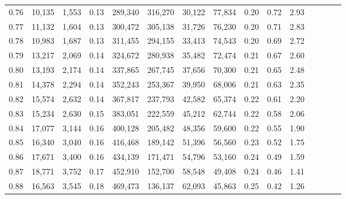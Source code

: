 \begin{tabular}{rrrcrrrrrrrrrrr}
0.76 &  10,135 &  1,553 &                                       0.13 &  289,340 &  316,270 &   30,122 &   77,834 &  0.20 &  0.72 &                         2.93 \\
0.77 &  11,132 &  1,604 &                                       0.13 &  300,472 &  305,138 &   31,726 &   76,230 &  0.20 &  0.71 &                         2.83 \\
0.78 &  10,983 &  1,687 &                                       0.13 &  311,455 &  294,155 &   33,413 &   74,543 &  0.20 &  0.69 &                         2.72 \\
0.79 &  13,217 &  2,069 &                                       0.14 &  324,672 &  280,938 &   35,482 &   72,474 &  0.21 &  0.67 &                         2.60 \\
0.80 &  13,193 &  2,174 &                                       0.14 &  337,865 &  267,745 &   37,656 &   70,300 &  0.21 &  0.65 &                         2.48 \\
0.81 &  14,378 &  2,294 &                                       0.14 &  352,243 &  253,367 &   39,950 &   68,006 &  0.21 &  0.63 &                         2.35 \\
0.82 &  15,574 &  2,632 &                                       0.14 &  367,817 &  237,793 &   42,582 &   65,374 &  0.22 &  0.61 &                         2.20 \\
0.83 &  15,234 &  2,630 &                                       0.15 &  383,051 &  222,559 &   45,212 &   62,744 &  0.22 &  0.58 &                         2.06 \\
0.84 &  17,077 &  3,144 &                                       0.16 &  400,128 &  205,482 &   48,356 &   59,600 &  0.22 &  0.55 &                         1.90 \\
0.85 &  16,340 &  3,040 &                                       0.16 &  416,468 &  189,142 &   51,396 &   56,560 &  0.23 &  0.52 &                         1.75 \\
0.86 &  17,671 &  3,400 &                                       0.16 &  434,139 &  171,471 &   54,796 &   53,160 &  0.24 &  0.49 &                         1.59 \\
0.87 &  18,771 &  3,752 &                                       0.17 &  452,910 &  152,700 &   58,548 &   49,408 &  0.24 &  0.46 &                         1.41 \\
0.88 &  16,563 &  3,545 &                                       0.18 &  469,473 &  136,137 &   62,093 &   45,863 &  0.25 &  0.42 &                         1.26 \\

\end{tabular}

